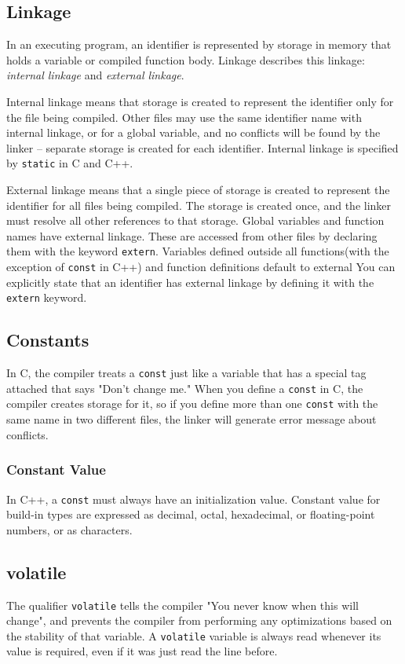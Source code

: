 \documentclass[11pt, a4paper]{book}
\begin{document}
\subsection{Linkage}
In an executing program, an identifier is represented by storage in memory that
holds a variable or compiled function body. Linkage describes this linkage:
\emph{internal linkage} and \emph{external linkage}.

Internal linkage means that storage is created to represent the identifier only
for the file being compiled. Other files may use the same identifier name with
internal linkage, or for a global variable, and no conflicts will be found by
the linker -- separate storage is created for each identifier. Internal linkage
is specified by \verb|static| in C and C++.


External linkage means that a single piece of storage is created to represent
the identifier for all files being compiled. The storage is created once, and
the linker must resolve all other references to that storage. Global variables
and function names have external linkage. These are accessed from other files by
declaring them with the keyword \verb|extern|. Variables defined outside all
functions(with the exception of \verb|const| in C++) and function definitions
default to external  You can explicitly state that an identifier has external
linkage by defining it with the \verb|extern| keyword.

\subsection{Constants}
In C, the compiler treats a \verb|const| just like a variable that has a special
tag attached that says "Don't change me." When you define a \verb|const| in C,
the compiler creates storage for it, so if you define more than one \verb|const|
with the same name in two different files, the linker will generate error
message about conflicts.

\subsubsection{Constant Value}
In C++, a \verb|const| must always have an initialization value. Constant value
for build-in types are expressed as decimal, octal, hexadecimal, or
floating-point numbers, or as characters.

\subsection{volatile}
The qualifier \verb|volatile| tells the compiler "You never know when this will
change", and prevents the compiler from performing any optimizations based on
the stability of that variable. A \verb|volatile| variable is always read
whenever its value is required, even if it was just read the line before.
\end{document}
